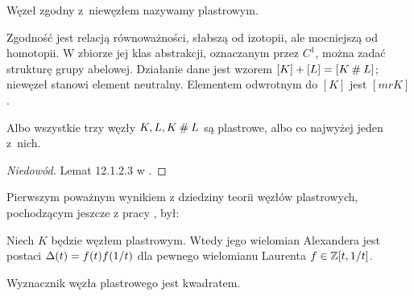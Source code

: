 \begin{definition} \label{def:slice_knot}
    Węzeł zgodny z~niewęzłem nazywamy plastrowym.
\end{definition}

Zgodność jest relacją równoważności, słabszą od izotopii, ale mocniejszą od homotopii.
W zbiorze jej klas abstrakcji, oznaczanym przez $C^1$, można zadać strukturę grupy abelowej.
Działanie dane jest wzorem $[K] + [L] = [K \mathbin{\#} L]$; niewęzeł stanowi element neutralny.
Elementem odwrotnym do $[K]$ jest $[mrK]$.


\begin{proposition}
    Albo wszystkie trzy węzły $K, L, K \mathbin{\#} L$ są plastrowe, albo co najwyżej jeden z~nich.
\end{proposition}

\begin{proof}[Niedowód]
    Lemat 12.1.2.3 w \cite{kawauchi96}.
\end{proof}

Pierwszym poważnym wynikiem z dziedziny teorii węzłów plastrowych, pochodzącym jeszcze z pracy \cite{fox66}, był:

\begin{proposition}
    Niech $K$ będzie węzłem plastrowym.
    Wtedy jego wielomian Alexandera jest postaci $\Delta(t) = f(t) f(1/t)$ dla pewnego wielomianu Laurenta $f \in \mathbb Z[t, 1/t]$.
\end{proposition}

\begin{corollary} \label{slice_square_det}
    Wyznacznik węzła plastrowego jest kwadratem.
\end{corollary}

